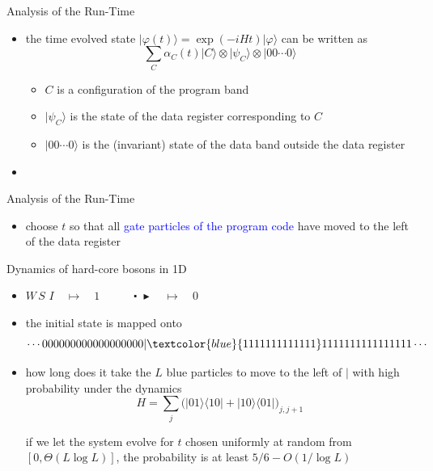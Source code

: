 \documentclass[slideColor]{prosper}
\newcommand{\bul}{\centerdot}
\newcommand{\gat}{\blacktriangleright}
\renewcommand{\>}{\rangle}
\newcommand{\<}{\langle}
\begin{document}
\begin{slide}{Analysis of the Run-Time}
\begin{itemize}
\item the time evolved state $|\varphi(t)\>=\exp(-iH t)|\varphi\>$ can be written as
\[
\sum_C \alpha_C(t) |C\> \otimes |\psi_C\> \otimes |00\cdots0\>
\]
\begin{itemize}
\item $C$ is a configuration of the program band

\medskip
\item $|\psi_C\>$ is the state of the data register corresponding to $C$

\medskip
\item $|00\cdots 0\>$ is the (invariant) state of the data band outside the data register
\end{itemize}
\item
\end{itemize}
\end{slide}


\begin{slide}{Analysis of the Run-Time}

\begin{itemize}
\item choose $t$ so that all \textcolor{blue}{gate particles of the program code} have moved to the left of the data register


\end{itemize}

\end{slide}


\begin{slide}{Dynamics of hard-core bosons in 1D}

\begin{itemize}

\item $W\, S\,\, I \quad\mapsto\quad 1\quad \quad\quad \bul\,\,\gat \quad\mapsto\quad 0$

\medskip
\item the initial state is mapped onto 
\[
\cdots 000000000000000000|\textcolor{blue}{1111111111111}1111111111111111\cdots
\]

\item how long does it take the $L$ blue particles to move to the left of $|$ with high probability under the dynamics
\[
H=\sum_j \Big( |01\>\<10| + |10\>\<01| \Big)_{j,j+1}
\]

\medskip if we let the system evolve for $t$ chosen uniformly at random from $[0,\Theta(L\log L)]$, the probability is at least $5/6-O(1/\log L)$
\end{itemize} 

\end{slide}
\end{document}
